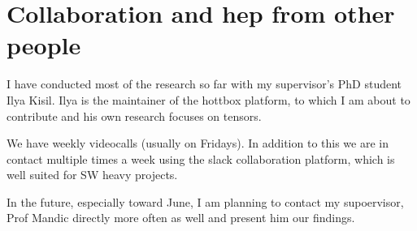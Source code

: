 \documentclass{article}
\begin{document}
\section{Collaboration and hep from other people \label{sec:collaboration}}

I have conducted most of the research so far with my supervisor's PhD student Ilya Kisil. Ilya is the maintainer of the hottbox platform, to which I am about to contribute and his own research focuses on tensors.

We have weekly videocalls (usually on Fridays). In addition to this we are in contact multiple times a  week using the slack collaboration platform, which is well suited for SW heavy projects.

In the future, especially toward June, I am planning to contact my supoervisor, Prof Mandic directly more often as well and present him our findings.


\printbibliography
\end{document}
